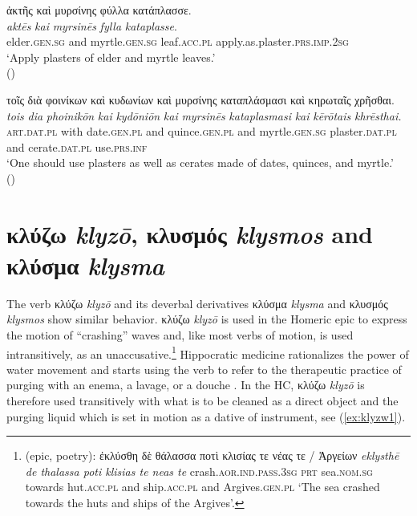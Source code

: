 \documentclass[output=paper,colorlinks,citecolor=brown]{langscibook}
\begin{document}
\begin{exe}
\ex\label{ex:HCkataplasma8}
\glll ἀκτῆς καὶ μυρσίνης φύλλα κατάπλασσε.\\ 
\textit{aktēs} \textit{kai} \textit{myrsinēs} \textit{fylla} \textit{kataplasse}. \\
elder.\textsc{gen.sg} and myrtle.\textsc{gen.sg} leaf.\textsc{acc.pl} apply.as.plaster.\textsc{prs.imp.2sg} \\
\glt ‘Apply plasters of elder and myrtle leaves.' \\
\hspace*{\fill}()
\end{exe}

\begin{exe}
\ex\label{ex:HCkataplasma9}
\glll τοῖς διὰ φοινίκων καὶ κυδωνίων καὶ μυρσίνης καταπλάσμασι καὶ κηρωταῖς χρῆσθαι. \\ 
\textit{tois} \textit{dia} \textit{phoinikōn} \textit{kai} \textit{kydōniōn} \textit{kai} \textit{myrsinēs} \textit{kataplasmasi} \textit{kai} \textit{kērōtais} \textit{khrēsthai.} \\
\textsc{art.dat.pl} with date.\textsc{gen.pl} and quince.\textsc{gen.pl} and myrtle.\textsc{gen.sg} plaster.\textsc{dat.pl} and cerate.\textsc{dat.pl} use.\textsc{prs.inf} \\
\glt ‘One should use plasters as well as cerates made of dates, quinces, and myrtle.' \\
\hspace*{\fill}()
\end{exe}

\largerpage
\section{κλύζω \textit{klyzō}, κλυσμός \textit{klysmos} and κλύσμα \textit{klysma}}
The verb κλύζω \textit{klyzō} and its deverbal derivatives κλύσμα \textit{klysma} and κλυσμός \textit{klysmos} show similar behavior. κλύζω \textit{klyzō} is used in the Homeric epic to express the motion of “crashing” waves and, like most verbs of motion, is used intransitively, as an unaccusative.\footnote{ (epic, poetry): ἐκλύσθη δὲ θάλασσα ποτὶ κλισίας τε νέας τε / Ἀργείων \textit{eklysthē de thalassa poti klisias te neas te} crash.\textsc{aor.ind.pass.3sg} \textsc{prt} sea.\textsc{nom.sg} towards hut.\textsc{acc.pl} and ship.\textsc{acc.pl} and Argives.\textsc{gen.pl} ‘The sea crashed towards the huts and ships of the Argives’.} Hippocratic medicine rationalizes the power of water movement and starts using the verb to refer to the therapeutic practice of purging with an enema, a lavage, or a douche \citep[ch. 5]{Squeri2023}. In the HC, κλύζω \textit{klyzō} is therefore used transitively with what is to be cleaned as a direct object and the purging liquid which is set in motion as a dative of instrument, see (\ref{ex:klyzw1}).
\end{document}
